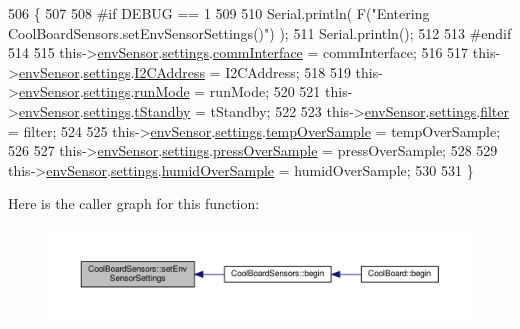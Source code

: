 \begin{DoxyCode}
506 \{
507 
508 \textcolor{preprocessor}{#if DEBUG == 1}
509     
510     Serial.println( F(\textcolor{stringliteral}{"Entering CoolBoardSensors.setEnvSensorSettings()"}) );
511     Serial.println();
512 
513 \textcolor{preprocessor}{#endif}
514   
515     this->\hyperlink{class_cool_board_sensors_a868e38985e9a2412829fa2790ca13e2e}{envSensor}.\hyperlink{class_b_m_e280_af06253eb2f8ad4b5fabb858bc4a973bf}{settings}.\hyperlink{struct_sensor_settings_a5bf116387c543a6ea5732976424e8cb1}{commInterface} = commInterface;      
516 
517     this->\hyperlink{class_cool_board_sensors_a868e38985e9a2412829fa2790ca13e2e}{envSensor}.\hyperlink{class_b_m_e280_af06253eb2f8ad4b5fabb858bc4a973bf}{settings}.\hyperlink{struct_sensor_settings_af8103021dbce7e5ee6d786c4893324f7}{I2CAddress} = I2CAddress;
518 
519     this->\hyperlink{class_cool_board_sensors_a868e38985e9a2412829fa2790ca13e2e}{envSensor}.\hyperlink{class_b_m_e280_af06253eb2f8ad4b5fabb858bc4a973bf}{settings}.\hyperlink{struct_sensor_settings_a0ffbdf34f4c23a2a167f00e4cb971dec}{runMode} = runMode; 
520 
521     this->\hyperlink{class_cool_board_sensors_a868e38985e9a2412829fa2790ca13e2e}{envSensor}.\hyperlink{class_b_m_e280_af06253eb2f8ad4b5fabb858bc4a973bf}{settings}.\hyperlink{struct_sensor_settings_a7098be3c1df0271dc9bc0fb45c1e9bb9}{tStandby} = tStandby; 
522 
523     this->\hyperlink{class_cool_board_sensors_a868e38985e9a2412829fa2790ca13e2e}{envSensor}.\hyperlink{class_b_m_e280_af06253eb2f8ad4b5fabb858bc4a973bf}{settings}.\hyperlink{struct_sensor_settings_a69dc95368069a0f408a141d4c2cbf045}{filter} = filter; 
524 
525     this->\hyperlink{class_cool_board_sensors_a868e38985e9a2412829fa2790ca13e2e}{envSensor}.\hyperlink{class_b_m_e280_af06253eb2f8ad4b5fabb858bc4a973bf}{settings}.\hyperlink{struct_sensor_settings_abdedc9d05f4850c58005313486958073}{tempOverSample} = tempOverSample;
526 
527     this->\hyperlink{class_cool_board_sensors_a868e38985e9a2412829fa2790ca13e2e}{envSensor}.\hyperlink{class_b_m_e280_af06253eb2f8ad4b5fabb858bc4a973bf}{settings}.\hyperlink{struct_sensor_settings_a85ba10cad25b479bba9cb42c6400ab21}{pressOverSample} = pressOverSample;
528 
529     this->\hyperlink{class_cool_board_sensors_a868e38985e9a2412829fa2790ca13e2e}{envSensor}.\hyperlink{class_b_m_e280_af06253eb2f8ad4b5fabb858bc4a973bf}{settings}.\hyperlink{struct_sensor_settings_a4a02fc7708071b88ccf610e3f7ed9d55}{humidOverSample} = humidOverSample;
530 
531 \}
\end{DoxyCode}
Here is the caller graph for this function\+:\nopagebreak
\begin{figure}[H]
\begin{center}
\leavevmode
\includegraphics[width=350pt]{de/d46/class_cool_board_sensors_a406307ffd70272282d91479c7ed8d66f_icgraph}
\end{center}
\end{figure}


